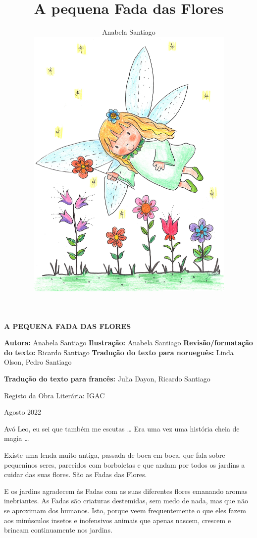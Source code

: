 \documentclass[12pt, a4paper, twoside]{memoir}
\title{\textbf{A pequena Fada das Flores}}
\author{Anabela Santiago\\[5mm] \includegraphics[width=4in]{voando}}
\date{}
\begin{document}
\frontmatter
{} %
\pagestyle{empty}
\maketitle
\newpage\null\thispagestyle{empty}\newpage %

\vspace*{1cm} %
\begin{center}
    \textbf{
        A PEQUENA FADA DAS FLORES
    }
\end{center}

\begin{vplace}
    \textbf{Autora:} Anabela Santiago
    \bigbreak
    \textbf{Ilustração:} Anabela Santiago
    \bigbreak
    \textbf{Revisão/formatação do texto:} Ricardo Santiago
    \bigbreak
    \textbf{Tradução do texto para norueguês:} Linda Olson, Pedro Santiago

    \textbf{Tradução do texto para francês:} Julia Dayon, Ricardo Santiago
    \bigbreak
\end{vplace}
Registo da Obra Literária: IGAC

\vfill
\begin{center}
    Agosto 2022
\end{center}

\newpage
\newpage\null\thispagestyle{empty}\newpage %

\begin{vplace}[4]
    \begin{flushright}
        Avó Leo, eu sei que também me escutas …
        \bigbreak
        Era uma vez uma história cheia de magia …
    \end{flushright}
\end{vplace}
\newpage

\mainmatter
\pagestyle{plain}

Existe uma lenda muito antiga, passada de boca em boca, que fala sobre pequeninos seres, parecidos com borboletas e que andam por todos os jardins a cuidar das suas flores. São as Fadas das Flores.

E os jardins agradecem às Fadas com as suas diferentes flores emanando aromas inebriantes.
\bigbreak
As Fadas são criaturas destemidas, sem medo de nada, mas que não se aproximam dos humanos. Isto, porque veem frequentemente o que eles fazem aos minúsculos insetos e inofensivos animais que apenas nascem, crescem e brincam continuamente nos jardins.
\end{document}
